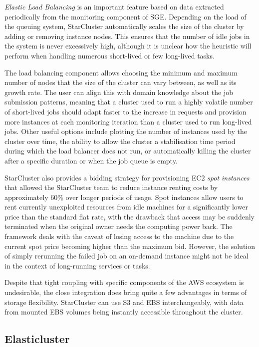 \textit{Elastic Load Balancing} is an important feature based on data extracted periodically from the monitoring component of SGE. Depending on the load of the queuing system, StarCluster automatically scales the size of the cluster by adding or removing instance nodes. This ensures that the number of idle jobs in the system is never excessively high, although it is unclear how the heuristic will perform when handling numerous short-lived or few long-lived tasks. 

The load balancing component allows choosing the minimum and maximum number of nodes that the size of the cluster can vary between, as well as its growth rate. The user can align this with domain knowledge about the job submission patterns, meaning that a cluster used to run a highly volatile number of short-lived jobs should adapt faster to the increase in requests and provision more instances at each monitoring iteration than a cluster used to run long-lived jobs. Other useful options include plotting the number of instances used by the cluster over time, the ability to allow the cluster a stabilisation time period during which the load balancer does not run, or automatically killing the cluster after a specific duration or when the job queue is empty.

StarCluster also provides a bidding strategy for provisioning EC2 \textit{spot instances} that allowed the StarCluster team to reduce instance renting costs by approximately 60\% over longer periods of usage. Spot instances allow users to rent currently unexploited resources from idle machines for a significantly lower price than the standard flat rate, with the drawback that access may be suddenly terminated when the original owner needs the computing power back. The framework deals with the caveat of losing access to the machine due to the current spot price becoming higher than the maximum bid. However, the solution of simply rerunning the failed job on an on-demand instance might not be ideal in the context of long-running services or tasks.

Despite that tight coupling with specific components of the AWS ecosystem is undesirable, the close integration does bring quite a few advantages in terms of storage flexibility. StarCluster can use S3 and EBS interchangeably, with data from mounted EBS volumes being instantly accessible throughout the cluster.

\subsection{Elasticluster} \label{ElasticlusterBackground}

